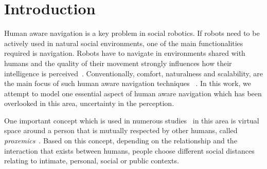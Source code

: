 \section{Introduction}


Human aware navigation is a key problem in social robotics. If robots need to be actively used in natural social environments, one of the main functionalities required is navigation. %
Robots have to navigate in environments shared with humans and the quality of their movement strongly influences  how their intelligence is perceived~\cite{Althaus2004}. Conventionally, comfort, naturalness and scalability, are the main focus of such human aware navigation techniques ~\cite{Kruse2013}. In this work, we attempt to model one essential aspect of human aware navigation which has been overlooked in this area, uncertainty in the perception.


One important concept which is used in numerous studies~\cite{Mumm2011,Takayama2009,Walters2011,ferrer2013robot} in this area is virtual space around a person that is mutually respected by other humans, called \textit{proxemics}~\cite{Hall1969}.
Based on this concept, depending on the relationship and the interaction that exists between humans, people choose different social distances relating to intimate, personal, social or public contexts.


